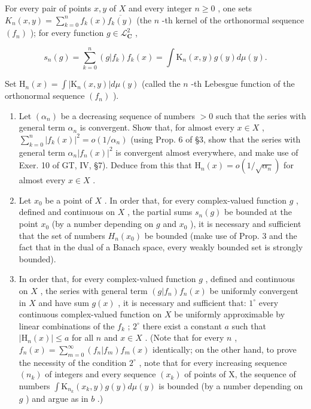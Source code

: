 For every pair of points \(x, y\) of \(X\) and every integer \(n \geqslant 0\) , one sets \(K_n(x, y) = \sum_{k=0}^{n} f_k(x) \overline{f_k(y)}\) (the \(n\) -th kernel of the orthonormal sequence \((f_n)\) ); for every function \(g \in \mathcal{L}_{\mathbf{C}}^2\) ,

\[
s _ {n} (g) = \sum_ {k = 0} ^ {n} (g | f _ {k}) f _ {k} (x) = \int \mathrm{K} _ {n} (x, y) g (y) d \mu (y).
\]

Set \(\mathrm{H}_n(x) = \int |\mathrm{K}_n(x,y)|d\mu (y)\) (called the \(n\) -th Lebesgue function of the orthonormal sequence \((f_n)\) ).

\begin{enumerate}
\def\labelenumi{\alph{enumi})}
\item
  Let \((\alpha_{n})\) be a decreasing sequence of numbers \(>0\) such that the series with general term \(\alpha_{n}\) is convergent. Show that, for almost every \(x \in X\) , \(\sum_{k=0}^{n} |f_{k}(x)|^{2} = o(1/\alpha_{n})\) (using Prop. 6 of §3, show that the series with general term \(\alpha_{n}|f_{n}(x)|^{2}\) is convergent almost everywhere, and make use of Exer. 10 of GT, IV, §7). Deduce from this that \(\mathrm{H}_{n}(x) = o(1/\sqrt{\alpha_{n}})\) for almost every \(x \in X\) .
\item
  Let \(x_0\) be a point of \(X\) . In order that, for every complex-valued function \(g\) , defined and continuous on \(X\) , the partial sums \(s_n(g)\) be bounded at the point \(x_0\) (by a number depending on \(g\) and \(x_0\) ), it is necessary and sufficient that the set of numbers \(H_n(x_0)\) be bounded (make use of Prop. 3 and the fact that in the dual of a Banach space, every weakly bounded set is strongly bounded).
\item
  In order that, for every complex-valued function \(g\) , defined and continuous on \(X\) , the series with general term \((g|f_n)f_n(x)\) be uniformly convergent in \(X\) and have sum \(g(x)\) , it is necessary and sufficient that: \(1^\circ\) every continuous complex-valued function on \(X\) be uniformly approximable by linear combinations of the \(f_k\) ; \(2^\circ\) there exist a constant \(a\) such that \(|\mathrm{H}_n(x)| \leqslant a\) for all \(n\) and \(x \in X\) . (Note that for every \(n\) , \(f_n(x) = \sum_{m=0}^{\infty}(f_n|f_m)f_m(x)\) identically; on the other hand, to prove the necessity of the condition \(2^{\circ}\) , note that for every increasing sequence \((n_{k})\) of integers and every sequence \((x_{k})\) of points of X, the sequence of numbers \(\int \mathrm{K}_{n_k}(x_k,y)g(y)d\mu (y)\) is bounded (by a number depending on \(g\) ) and argue as in \(b\) .)
\end{enumerate}

